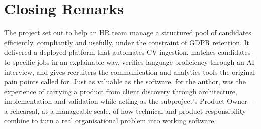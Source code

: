 
\section{Closing Remarks}
\label{sec:concl-closing}

The project set out to help an HR team manage a structured pool of
candidates efficiently, compliantly and usefully, under the constraint of
GDPR retention. It delivered a deployed platform that automates CV ingestion,
matches candidates to specific jobs in an explainable way, verifies language
proficiency through an AI interview, and gives recruiters the communication
and analytics tools the original pain points called for. Just as valuable as
the software, for the author, was the experience of carrying a product from
client discovery through architecture, implementation and validation while
acting as the subproject's Product Owner --- a rehearsal, at a manageable
scale, of how
technical and product responsibility combine to turn a real organisational
problem into working software.
